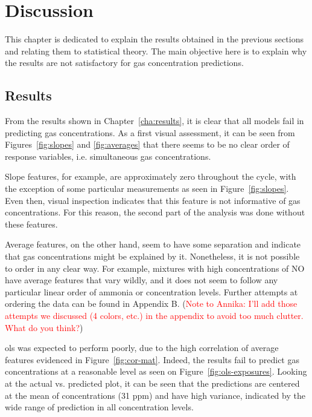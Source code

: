 \chapter{Discussion}
\label{cha:discussion}

This chapter is dedicated to explain the results obtained in the previous sections and relating them to statistical theory. The main objective here is to explain why the results are not satisfactory for gas concentration predictions.

\section{Results}
\label{sec:discussion-results}

From the results shown in Chapter~\ref{cha:results}, it is clear that all models fail in predicting gas concentrations. As a first visual assessment, it can be seen from Figures~\ref{fig:slopes} and \ref{fig:averages} that there seems to be no clear order of response variables, i.e. simultaneous gas concentrations.

 Slope features, for example, are approximately zero throughout the cycle, with the exception of some particular measurements as seen in Figure~\ref{fig:slopes}. Even then, visual inspection indicates that this feature is not informative of gas concentrations. For this reason, the second part of the analysis was done without these features.
 
 Average features, on the other hand, seem to have some separation and indicate that gas concentrations might be explained by it. Nonetheless, it is not possible to order in any clear way. For example, mixtures with high concentrations of NO have average features that vary wildly, and it does not seem to follow any particular linear order of ammonia or \nox concentration levels. Further attempts at ordering the data can be found in Appendix B. (\textcolor{red}{Note to Annika: I'll add those attempts we discussed (4 colors, etc.) in the appendix to avoid too much clutter. What do you think?})
 
\acrlong{ols} was expected to perform poorly, due to the high correlation of average features evidenced in Figure~\ref{fig:cor-mat}. Indeed, the results fail to predict gas concentrations at a reasonable level as seen on Figure~\ref{fig:ols-exposures}. Looking at the actual vs. predicted plot, it can be seen that the predictions are centered at the mean of concentrations (31 ppm) and have high variance, indicated by the wide range of prediction in all concentration levels.

